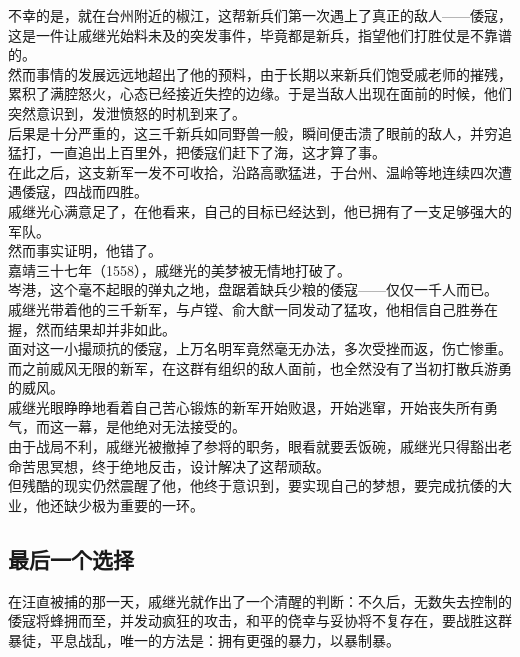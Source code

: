 \begin{multicols}{\theparacolNo}
不幸的是，就在台州附近的椒江，这帮新兵们第一次遇上了真正的敌人——倭寇，这是一件让戚继光始料未及的突发事件，毕竟都是新兵，指望他们打胜仗是不靠谱的。\\

然而事情的发展远远地超出了他的预料，由于长期以来新兵们饱受戚老师的摧残，累积了满腔怒火，心态已经接近失控的边缘。于是当敌人出现在面前的时候，他们突然意识到，发泄愤怒的时机到来了。\\

后果是十分严重的，这三千新兵如同野兽一般，瞬间便击溃了眼前的敌人，并穷追猛打，一直追出上百里外，把倭寇们赶下了海，这才算了事。\\

在此之后，这支新军一发不可收拾，沿路高歌猛进，于台州、温岭等地连续四次遭遇倭寇，四战而四胜。\\

戚继光心满意足了，在他看来，自己的目标已经达到，他已拥有了一支足够强大的军队。\\

然而事实证明，他错了。\\

嘉靖三十七年（1558），戚继光的美梦被无情地打破了。\\

岑港，这个毫不起眼的弹丸之地，盘踞着缺兵少粮的倭寇——仅仅一千人而已。\\

戚继光带着他的三千新军，与卢镗、俞大猷一同发动了猛攻，他相信自己胜券在握，然而结果却并非如此。\\

面对这一小撮顽抗的倭寇，上万名明军竟然毫无办法，多次受挫而返，伤亡惨重。而之前威风无限的新军，在这群有组织的敌人面前，也全然没有了当初打散兵游勇的威风。\\

戚继光眼睁睁地看着自己苦心锻炼的新军开始败退，开始逃窜，开始丧失所有勇气，而这一幕，是他绝对无法接受的。\\

由于战局不利，戚继光被撤掉了参将的职务，眼看就要丢饭碗，戚继光只得豁出老命苦思冥想，终于绝地反击，设计解决了这帮顽敌。\\

但残酷的现实仍然震醒了他，他终于意识到，要实现自己的梦想，要完成抗倭的大业，他还缺少极为重要的一环。\\

\subsection{最后一个选择}
在汪直被捕的那一天，戚继光就作出了一个清醒的判断：不久后，无数失去控制的倭寇将蜂拥而至，并发动疯狂的攻击，和平的侥幸与妥协将不复存在，要战胜这群暴徒，平息战乱，唯一的方法是：拥有更强的暴力，以暴制暴。\\


\end{multicols}
